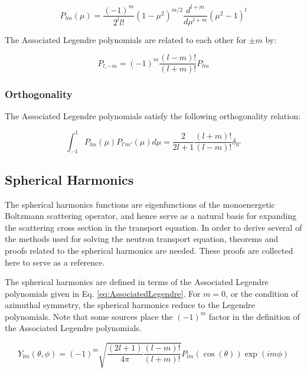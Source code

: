 \documentclass[10pt]{article}
\begin{document}
\begin{flushleft}
\begin{equation}
\label{eq:AssociatedLegendre}
P_{lm}(\mu)=\frac{(-1)^m}{2^ll!}(1-\mu^2)^{m/2}\frac{d^{l+m}}{d\mu^{l+m}}(\mu^2-1)^l
\end{equation}

The Associated Legendre polynomials are related to each other for \(\pm m\) by:

\begin{equation}
\label{eq:relatingALP}
P_{l,-m}=(-1)^m\frac{(l-m)!}{(l+m)!}P_{lm}
\end{equation}




\subsubsection{Orthogonality}

The Associated Legendre polynomials satisfy the following orthogonality relation:

\begin{equation}
\label{eq:AssociatedLegendreOthogonality}
\int_{-1}^{1}P_{lm}(\mu)P_{l'm'}(\mu)d\mu=\frac{2}{2l+1}\frac{(l+m)!}{(l-m)!}\delta_{ll'}
\end{equation}





\subsection{Spherical Harmonics}

The spherical harmonics functions are eigenfunctions of the monoenergetic Boltzmann scattering operator, and hence serve as a natural basis for expanding the scattering cross section in the transport equation. In order to derive several of the methods used for solving the neutron transport equation, theorems and proofs related to the spherical harmonics are needed. These proofs are collected here to serve as a reference.

The spherical harmonics are defined in terms of the Associated Legendre polynomials given in Eq. \eqref{eq:AssociatedLegendre}. For \(m=0\), or the condition of azimuthal symmetry, the spherical harmonics reduce to the Legendre polynomials. Note that some sources place the \((-1)^m\) factor in the definition of the Associated Legendre polynomials. 

\begin{equation}
\label{eq:SphericaltoAssociated}
Y_{lm}(\theta,\phi)=(-1)^m\sqrt{\frac{(2l+1)}{4\pi}\frac{(l-m)!}{(l+m)!}}P_{lm}(\cos{(\theta)})\exp{(im\phi)}
\end{equation}


\end{flushleft}
\end{document}
